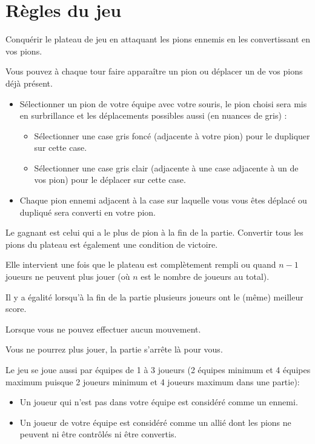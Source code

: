 \documentclass[11pt,a4paper]{article}
\begin{document}
\section{Règles du jeu}
\vspace{14px}
\begin{description}[itemsep=20pt]
    \item[Objectif:] Conquérir le plateau de jeu en attaquant les pions ennemis en les convertissant en vos pions.
    \item[Comment jouer:] Vous pouvez à chaque tour faire apparaître un pion ou déplacer un de vos pions déjà présent. 
    \begin{itemize}
        \item  Sélectionner un pion de votre équipe avec votre souris, le pion choisi sera mis en surbrillance et les déplacements possibles aussi (en nuances de gris) :
        \begin{itemize}[label=\textbullet]
            \item Sélectionner une case gris foncé (adjacente à votre pion) pour le dupliquer sur cette case.
            \item Sélectionner une case gris clair (adjacente à une case adjacente à un de vos pion) pour le déplacer sur cette case.
        \end{itemize}
        \item Chaque pion ennemi adjacent à la case sur laquelle vous vous êtes déplacé ou dupliqué sera converti en votre pion.
        \label{item:regle}
    \end{itemize}
    
    \item[Comment gagner:] Le gagnant est celui qui a le plus de pion à la fin de la partie. Convertir tous les pions du plateau est également une condition de victoire.
    
    \item[Fin de la partie:] Elle intervient une fois que le plateau est complètement rempli ou quand $n - 1$ joueurs ne peuvent plus jouer (où $n$ est le nombre de joueurs au total).
    
    \item[Egalité:] Il y a égalité lorsqu'à la fin de la partie plusieurs joueurs ont le (même) meilleur score. 
    \item[Passage automatique du tour:] Lorsque vous ne pouvez effectuer aucun mouvement.
    \item[Plus de pions sur le plateau:] Vous ne pourrez plus jouer, la partie s'arrête là pour vous.
    \item[Equipes:] Le jeu se joue aussi par équipes de 1 à 3 joueurs (2 équipes minimum et 4 équipes maximum puisque 2 joueurs minimum et 4 joueurs maximum dans une partie):
    \begin{itemize}
        \item Un joueur qui n'est pas dans votre équipe est considéré comme un ennemi.
        \item Un joueur de votre équipe est considéré comme un allié dont les pions ne peuvent ni être contrôlés ni être convertis.
    \end{itemize}
\end{description}
\end{document}
